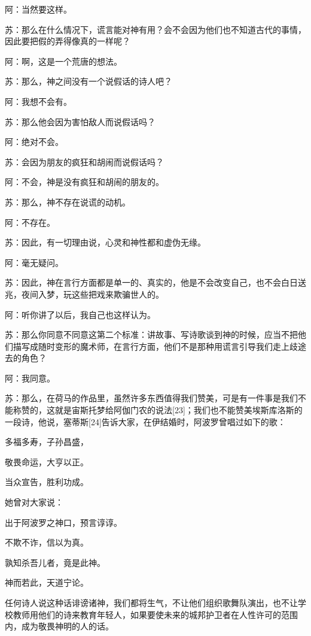 \documentclass[12pt,oneside]{book}
\begin{document}
阿：当然要这样。

苏：那么在什么情况下，谎言能对神有用？会不会因为他们也不知道古代的事情，因此要把假的弄得像真的一样呢？

阿：啊，这是一个荒唐的想法。

苏：那么，神之间没有一个说假话的诗人吧？

阿：我想不会有。

苏：那么他会因为害怕敌人而说假话吗？

阿：绝对不会。

苏：会因为朋友的疯狂和胡闹而说假话吗？

阿：不会，神是没有疯狂和胡闹的朋友的。

苏：那么，神不存在说谎的动机。

阿：不存在。

苏：因此，有一切理由说，心灵和神性都和虚伪无缘。

阿：毫无疑问。

苏：因此，神在言行方面都是单一的、真实的，他是不会改变自己，也不会白日送兆，夜间入梦，玩这些把戏来欺骗世人的。

阿：听你讲了以后，我自己也这样认为。

苏：那么你同意不同意这第二个标准：讲故事、写诗歌谈到神的时候，应当不把他们描写成随时变形的魔术师，在言行方面，他们不是那种用谎言引导我们走上歧途去的角色？

阿：我同意。

苏：那么，在荷马的作品里，虽然许多东西值得我们赞美，可是有一件事是我们不能称赞的，这就是宙斯托梦给阿伽门农的说法[23]；我们也不能赞美埃斯库洛斯的一段诗，他说，塞蒂斯[24]告诉大家，在伊结婚时，阿波罗曾唱过如下的歌：





多福多寿，子孙昌盛，

敬畏命运，大亨以正。

当众宣告，胜利功成。





她曾对大家说：





出于阿波罗之神口，预言谆谆。

不欺不诈，信以为真。

孰知杀吾儿者，竟是此神。

神而若此，天道宁论。





任何诗人说这种话诽谤诸神，我们都将生气，不让他们组织歌舞队演出，也不让学校教师用他们的诗来教育年轻人，如果要使未来的城邦护卫者在人性许可的范围内，成为敬畏神明的人的话。
\end{document}
